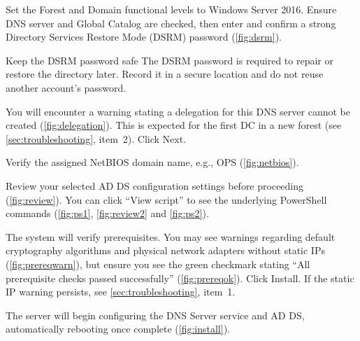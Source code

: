 Set the Forest and Domain functional levels to Windows Server 2016. Ensure DNS server and Global Catalog are checked, then enter and confirm a strong Directory Services Restore Mode (DSRM) password (\autoref{fig:dsrm}).


\begin{callout}{Keep the DSRM password safe}
The DSRM password is required to repair or restore the directory later. Record it in a secure location and do not reuse another account's password.
\end{callout}

You will encounter a warning stating a delegation for this DNS server cannot be created (\autoref{fig:delegation}). This is expected for the first DC in a new forest (see \autoref{sec:troubleshooting}, item~2). Click Next.


Verify the assigned NetBIOS domain name, e.g., OPS (\autoref{fig:netbios}).


Review your selected AD DS configuration settings before proceeding (\autoref{fig:review}). You can click ``View script'' to see the underlying PowerShell commands (\autoref{fig:ps1}, \autoref{fig:review2} and \autoref{fig:ps2}).


The system will verify prerequisites. You may see warnings regarding default cryptography algorithms and physical network adapters without static IPs (\autoref{fig:prereqwarn}), but ensure you see the green checkmark stating ``All prerequisite checks passed successfully'' (\autoref{fig:prereqok}). Click Install. If the static IP warning persists, see \autoref{sec:troubleshooting}, item~1.


The server will begin configuring the DNS Server service and AD DS, automatically rebooting once complete (\autoref{fig:install}).

